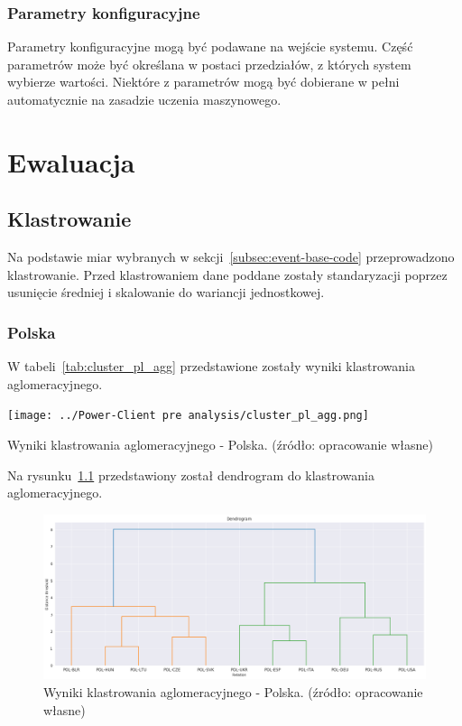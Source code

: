 \documentclass[11pt]{report}
\begin{document}
    \subsection{Parametry konfiguracyjne}
    Parametry konfiguracyjne mogą być podawane na wejście systemu.
    Część parametrów może być określana w postaci przedziałów, z których system wybierze wartości.
    Niektóre z parametrów mogą być dobierane w pełni automatycznie na zasadzie uczenia maszynowego.


    \chapter{Ewaluacja}\label{ch:ewaluacja}


    \section{Klastrowanie}
    Na podstawie miar wybranych w sekcji~\ref{subsec:event-base-code} przeprowadzono klastrowanie.
    Przed klastrowaniem dane poddane zostały standaryzacji poprzez usunięcie średniej i skalowanie do wariancji jednostkowej.

    \subsection{Polska}
    W tabeli~\ref{tab:cluster_pl_agg} przedstawione zostały wyniki klastrowania aglomeracyjnego.
    \begin{table}[!htp]
        \centering
        \texttt{[image: ../Power-Client pre analysis/cluster\_pl\_agg.png]}
        \caption{Wyniki klastrowania aglomeracyjnego - Polska. (źródło: opracowanie własne)}
        \label{tab:cluster_pl_agg}
    \end{table}
    Na rysunku~\ref{fig:cluster_pl_agg_dendrogram} przedstawiony został dendrogram do klastrowania aglomeracyjnego.
    \begin{figure}[!htp]
        \centering
        \includegraphics[width=\linewidth]{../Power-Client pre analysis/cluster_pl_agg_dendrogram.png}
        \caption{Wyniki klastrowania aglomeracyjnego - Polska. (źródło: opracowanie własne)}
        \label{fig:cluster_pl_agg_dendrogram}
    \end{figure}
\end{document}
